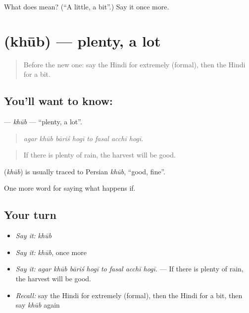 \begin{tcolorbox}[breakable,colback=teal!4,colframe=teal!35!black,title={Before you move on}]
What does  mean? (\textquotedblleft{}A little, a bit\textquotedblright{}.) Say it once more.
\end{tcolorbox}
\section[\texorpdfstring{\hi{ख़ूब} (khūb)}{ख़ूब (khūb)}]{ (khūb) — plenty, a lot}

\label{lesson:HI-C387-khub}



\begin{quote}
Before the new one: say the Hindi for extremely (formal), then the Hindi for a bit.
\end{quote}

\subsection*{You'll want to know: }
\textbf{} — \emph{khūb} — \textquotedblleft{}plenty, a lot\textquotedblright{}.

\begin{quote}
       
\end{quote}

\begin{quote}
\emph{agar khūb bāriś hogī to fasal acchī hogī.}
\end{quote}

\begin{quote}
If there is plenty of rain, the harvest will be good.
\end{quote}

\begin{cousinweb}
\textbf{} (\emph{khūb}) is usually traced to Persian \emph{khūb}, \textquotedblleft{}good, fine\textquotedblright{}.
\end{cousinweb}

\begin{grammarlens}[title={What you've built}]
One more word for saying what happens if.
\end{grammarlens}

\subsection*{Your turn}
\begin{itemize}
\raggedright
  \item \emph{Say it:} \emph{khūb}
  \item \emph{Say it:} \emph{khūb}, once more
  \item \emph{Say it:} \emph{agar khūb bāriś hogī to fasal acchī hogī.} — If there is plenty of rain, the harvest will be good.
  \item \emph{Recall:} say the Hindi for extremely (formal), then the Hindi for a bit, then say \emph{khūb} again
\end{itemize}

